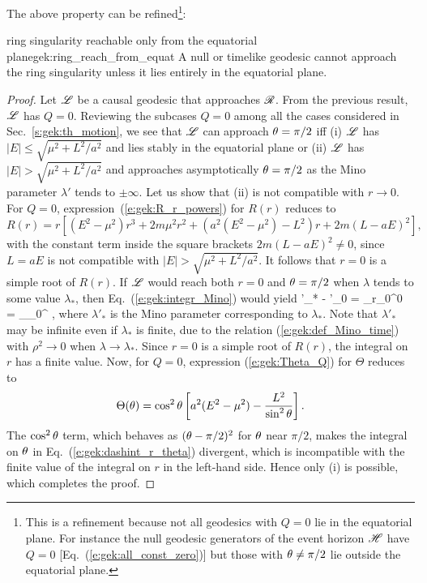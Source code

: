 The above property can be refined\footnote{This is a refinement because not all
geodesics with $Q=0$ lie in the equatorial plane. For instance the
null geodesic generators of the event horizon $\mathscr{H}$ have $Q=0$ [Eq.~(\ref{e:gek:all_const_zero})]
but those with $\theta\neq \pi/2$ lie outside the equatorial plane.}:
\begin{tprop}{ring singularity reachable only from the equatorial plane}{gek:ring_reach_from_equat}
A null or timelike geodesic cannot approach the ring singularity unless it lies
entirely in the equatorial plane.
\end{tprop}

\begin{proof}
Let $\mathscr{L}$ be a causal geodesic that approaches $\mathscr{R}$. From the previous result,
$\mathscr{L}$ has $Q=0$. Reviewing the subcases $Q=0$ among all the cases considered in
Sec.~\ref{s:gek:th_motion}, we see that $\mathscr{L}$ can approach $\theta=\pi/2$ iff
(i) $\mathscr{L}$ has
$|E|\leq \sqrt{\mu^2 + L^2/a^2}$ and lies stably in the equatorial plane
or (ii) $\mathscr{L}$ has $|E| > \sqrt{\mu^2 + L^2/a^2}$ and approaches asymptotically
$\theta=\pi/2$ as the Mino parameter $\lambda'$ tends to $\pm\infty$.
Let us show that (ii) is not compatible with $r\to 0$.
For $Q=0$, expression~(\ref{e:gek:R_r_powers}) for $R(r)$ reduces to
\[
 R(r) = r \left[ (E^2 - \mu^2) r^3 + 2 m \mu^2 r^2
     + \left( a^2(E^2 - \mu^2) - L^2 \right) r
     + 2m (L - a E)^2 \right] ,
\]
with the constant term inside the square brackets $2m(L - a E)^2 \neq 0$,
since $L=a E$ is not compatible with $|E| > \sqrt{\mu^2 + L^2/a^2}$. It
follows that $r=0$ is a simple root of $R(r)$. If $\mathscr{L}$ would reach both
$r=0$ and $\theta=\pi/2$ when $\lambda$ tends to some value $\lambda_*$,
then Eq.~(\ref{e:gek:integr_Mino}) would yield
\be \label{e:gek:dashint_r_theta}
    \lambda'_* - \lambda'_0 = \dashint_{r_0}^0 
    = \dashint_{\th_0}^{} \frac{\eps_\th \, \D \th}{\sqrt{\Theta(\th)}} ,
\ee
where $\lambda'_*$ is the Mino parameter corresponding to $\lambda_*$. Note that
$\lambda'_*$ may be infinite even if $\lambda_*$ is finite, due to the
relation (\ref{e:gek:def_Mino_time}) with $\rho^2\to 0$ when $\lambda\to\lambda_*$.
Since $r=0$ is a simple root of $R(r)$, the integral on $r$ has a finite value.
Now, for $Q=0$, expression (\ref{e:gek:Theta_Q}) for $\Theta$ reduces to
\[
    \Theta(\theta) = \cos^2\theta \left[ a^2 (E^2 - \mu^2)
    - \frac{L^2}{\sin^2\theta} \right] .
\]
The $\cos^2\theta$ term, which behaves as $(\theta - \pi/2)^2$ for $\theta$ near $\pi/2$,
makes the integral on $\theta$ in
Eq.~(\ref{e:gek:dashint_r_theta}) divergent, which is incompatible with the
finite value of the integral on $r$ in the left-hand side. Hence only (i) is possible, which completes
the proof.
\end{proof}

